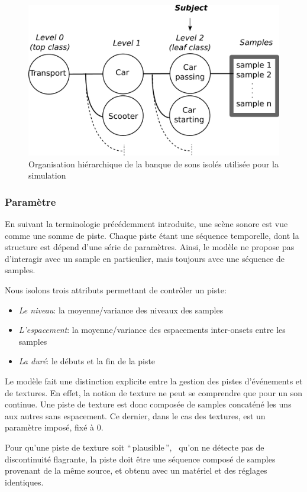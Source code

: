 \begin{figure}[bth]
        \myfloatalign
        \includegraphics[width=.8\linewidth]{gfx/3}
       \caption{Organisation hiérarchique de la banque de sons isolés utilisée pour la simulation}\label{fig:orgDb}
\end{figure}

\subsubsection{Paramètre}

En suivant la terminologie précédemment introduite, une scène sonore est vue comme une somme de piste. Chaque piste étant une séquence temporelle, dont la structure est dépend d'une série de paramètres. Ainsi, le modèle ne propose pas d’interagir avec un sample en particulier, mais toujours avec une séquence de samples.

Nous isolons trois attributs permettant de contrôler un piste:

\begin{itemize}
\item \emph{Le niveau}: la moyenne/variance des niveaux des samples
\item \emph{L'espacement}: la moyenne/variance des espacements inter-onsets entre les samples
\item \emph{La duré}: le débuts et la fin de la piste
\end{itemize}

Le modèle fait une distinction explicite entre la gestion des pistes d'événements et de textures. En effet, la notion de texture ne peut se comprendre que pour un son continue. Une piste de texture est donc composée de samples concaténé les uns aux autres sans espacement. Ce dernier, dans le cas des textures, est un paramètre imposé, fixé à 0. 

Pour qu'une piste de texture soit ``\,plausible\,'', \ie~qu'on ne détecte pas de discontinuité flagrante, la piste doit être une séquence composé de samples provenant de la même source, et obtenu avec un matériel et des réglages identiques.

